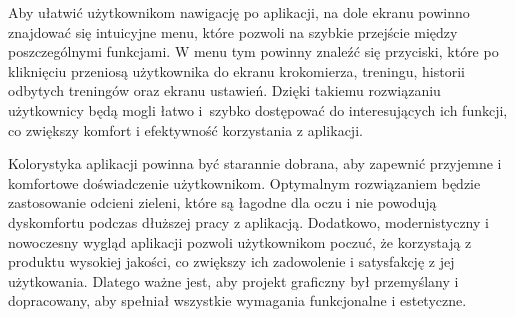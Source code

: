 Aby ułatwić użytkownikom nawigację po aplikacji, na dole ekranu powinno znajdować się intuicyjne menu, które pozwoli na szybkie przejście między poszczególnymi funkcjami. W menu tym powinny znaleźć się przyciski, które po kliknięciu przeniosą użytkownika do ekranu krokomierza, treningu, historii odbytych treningów oraz ekranu ustawień. Dzięki takiemu rozwiązaniu użytkownicy będą mogli łatwo i~szybko dostępować do interesujących ich funkcji, co zwiększy komfort i efektywność korzystania z aplikacji.

Kolorystyka aplikacji powinna być starannie dobrana, aby zapewnić przyjemne i komfortowe doświadczenie użytkownikom. Optymalnym rozwiązaniem będzie zastosowanie odcieni zieleni, które są łagodne dla oczu i nie powodują dyskomfortu podczas dłuższej pracy z aplikacją. Dodatkowo, modernistyczny i nowoczesny wygląd aplikacji pozwoli użytkownikom poczuć, że korzystają z produktu wysokiej jakości, co zwiększy ich zadowolenie i satysfakcję z jej użytkowania. Dlatego ważne jest, aby projekt graficzny był przemyślany i dopracowany, aby spełniał wszystkie wymagania funkcjonalne i estetyczne.